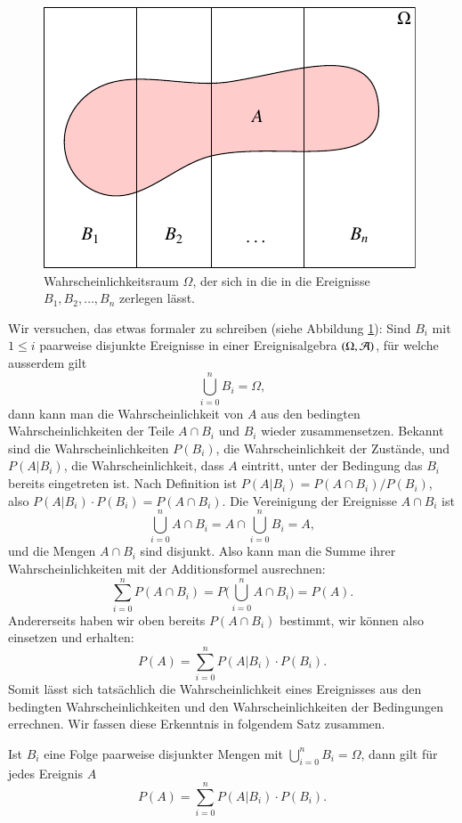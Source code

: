\begin{figure}
\begin{center}
\includegraphics{images/total-1.pdf}
\end{center}
\caption{Wahrscheinlichkeitsraum $\Omega$, der sich in die in die
Ereignisse $B_1,B_2,\dots,B_n$ zerlegen lässt.\label{zerlegung}}
\end{figure}
Wir versuchen, das etwas formaler zu schreiben
(siehe Abbildung \ref{zerlegung}):
Sind $B_i$ mit $1\le i$ paarweise
disjunkte Ereignisse
in einer Ereignisalgebra $(\Omega,{\cal A})$, für welche ausserdem
gilt
\[
\bigcup_{i=0}^{n}B_i = \Omega,
\]
dann kann man die Wahrscheinlichkeit von $A$ aus den bedingten
Wahrscheinlichkeiten der Teile $A\cap B_i$ und $B_i$ wieder zusammensetzen.
Bekannt sind die Wahrscheinlichkeiten
$P(B_i)$, die Wahrscheinlichkeit der Zustände, und
$P(A|B_i)$, die Wahrscheinlichkeit, dass $A$ eintritt, unter der Bedingung
das $B_i$ bereits eingetreten ist.
Nach Definition ist $P(A|B_i)=P(A\cap B_i)/P(B_i)$, also
$P(A|B_i)\cdot P(B_i) = P(A\cap B_i)$.
Die Vereinigung der Ereignisse $A\cap B_i$ ist
\[
\bigcup_{i=0}^{n} A\cap B_i=A\cap\bigcup_{i=0}^{n}B_i=A,
\]
und die Mengen $A\cap B_i$ sind disjunkt.
Also kann man die Summe ihrer
Wahrscheinlichkeiten mit der Additionsformel ausrechnen:
\[
\sum_{i=0}^{n}P(A\cap B_i)=P\biggl(\bigcup_{i=0}^{n}A\cap B_i\biggr)=P(A).
\]
Andererseits
haben wir oben bereits $P(A\cap B_i)$ bestimmt, wir können
also einsetzen und erhalten:
\[
P(A)=\sum_{i=0}^{n}P(A|B_i)\cdot P(B_i).
\]
Somit lässt sich tatsächlich die Wahrscheinlichkeit eines Ereignisses
aus den bedingten Wahrscheinlichkeiten und den Wahrscheinlichkeiten
der Bedingungen errechnen.
Wir fassen diese Erkenntnis in folgendem Satz zusammen.
\begin{satz}
Ist $B_i$ eine Folge paarweise disjunkter Mengen mit $\bigcup_{i=0}^{n}B_i=\Omega$, dann gilt für jedes Ereignis $A$
\[
P(A)=\sum_{i=0}^{n}P(A|B_i)\cdot P(B_i).
\]
\end{satz}

